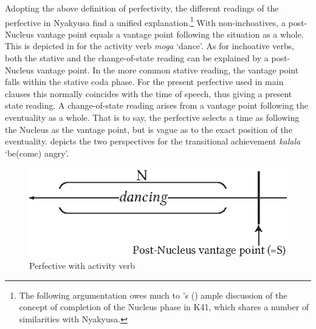 Adopting the above definition of perfectivity, the different readings of the perfective in Nyakyusa find a unified explanation.\footnote{The following argumentation owes much to \citeauthor{CraneTM2011}'s (\citeyear{CraneTM2011}) ample discussion of the concept of completion of the Nucleus phase in  K41, which shares a number of similarities with Nyakyusa.} With non-inchoatives, a post-Nucleus vantage point equals a vantage point following the situation as a whole. This is depicted in  for the activity verb \textit{moga} \lq dance'. As for inchoative verbs, both the stative and the change-of-state reading can be explained by a post-Nucleus vantage point. In the more common stative reading, the vantage point falls within the stative coda phase. For the present perfective used in main clauses this normally coincides with the time of speech, thus giving a present state reading. A change-of-state reading arises from a vantage point following the eventuality as a whole. That is to say, the perfective selects a time as following the Nucleus as the vantage point, but is vague as to the exact position of the eventuality.  depicts the two perspectives for the transitional achievement \textit{kalala} \lq be(come) angry'.

\begin{figure} 
\begin{center}
\includegraphics{figures/GrafikActivityCompletive.eps}
\caption{Perfective with activity verb}
\label{FigurePerfectiveActivity}
\end{center}
\end{figure}

